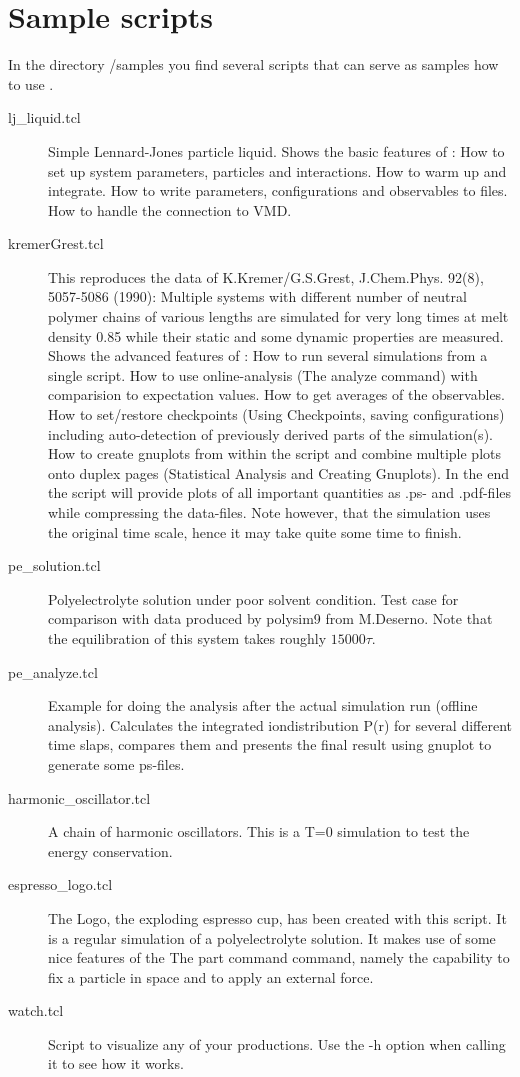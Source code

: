 \chapter{Sample scripts}
\label{chap:samples}

In the directory \es{}/samples you find several scripts that can serve
as samples how to use \es{}.
\begin{description}
\item[lj\_liquid.tcl] Simple Lennard-Jones particle liquid. Shows the
  basic features of \es{}: How to set up system parameters, particles
  and interactions. How to warm up and integrate. How to write
  parameters, configurations and observables to files. How to handle
  the connection to VMD.
\item[kremerGrest.tcl] This reproduces the data of K.Kremer/G.S.Grest,
  J.Chem.Phys. 92(8), 5057-5086 (1990): Multiple systems with
  different number of neutral polymer chains of various lengths are
  simulated for very long times at melt density 0.85 while their
  static and some dynamic properties are measured.  Shows the advanced
  features of \es{}: How to run several simulations from a single
  script. How to use online-analysis (The analyze command) with
  comparision to expectation values. How to get averages of the
  observables. How to set/restore checkpoints (Using Checkpoints,
  saving configurations) including auto-detection of previously
  derived parts of the simulation(s). How to create gnuplots from
  within the script and combine multiple plots onto duplex pages
  (Statistical Analysis and Creating Gnuplots).  In the end the script
  will provide plots of all important quantities as .ps- and
  .pdf-files while compressing the data-files. Note however, that the
  simulation uses the original time scale, hence it may take quite
  some time to finish.
\item[pe\_solution.tcl] Polyelectrolyte solution under poor solvent
  condition. Test case for comparison with data produced by polysim9
  from M.Deserno. Note that the equilibration of this system takes
  roughly $15000 \tau$.
\item[pe\_analyze.tcl] Example for doing the analysis after the actual
  simulation run (offline analysis). Calculates the integrated
  iondistribution P(r) for several different time slaps, compares them
  and presents the final result using gnuplot to generate some
  ps-files.
\item[harmonic\_oscillator.tcl] A chain of harmonic oscillators. This
  is a T=0 simulation to test the energy conservation.
\item[espresso\_logo.tcl] The \es{} Logo, the exploding espresso cup,
  has been created with this script. It is a regular simulation of a
  polyelectrolyte solution. It makes use of some nice features of the
  The part command command, namely the capability to fix a particle in
  space and to apply an external force.
\item[watch.tcl] Script to visualize any of your productions. Use the
  -h option when calling it to see how it works.
\end{description}

